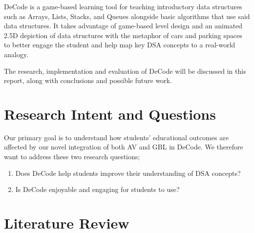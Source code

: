 \documentclass[11pt]{article}
\begin{document}
DeCode is a game-based learning tool for teaching introductory data structures such as Arrays, Lists, Stacks, and Queues alongside basic algorithms that use said data structures. It takes advantage of game-based level design and an animated 2.5D depiction of data structures with the metaphor of cars and parking spaces to better engage the student and help map key DSA concepts to a real-world analogy.\par
The research, implementation and evaluation of DeCode will be discussed in this report, along with conclusions and possible future work.
\section{Research Intent and Questions}
Our primary goal is to understand how students' educational outcomes are affected by our novel integration of both AV and GBL in DeCode. We therefore want to address these two research questions;
\begin{spacing}{1.5}
\begin{enumerate}
  \item Does DeCode help students improve their understanding of DSA concepts?
  \item Is DeCode enjoyable and engaging for students to use?
\end{enumerate}
\end{spacing}
\section{Literature Review}
\end{document}
